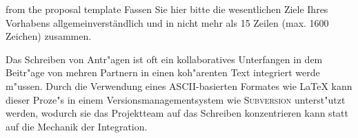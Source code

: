 \begin{Abriss}
\begin{todo}{from the proposal template}
  Fassen Sie hier bitte die wesentlichen Ziele Ihres Vorhabens allgemeinverständlich und
  in nicht mehr als 15 Zeilen (max. 1600 Zeichen) zusammen.
\end{todo}
Das Schreiben von Antr"agen ist oft ein kollaboratives Unterfangen in dem Beitr"age von
mehren Partnern in einen koh"arenten Text integriert werde m"ussen. Durch die Verwendung
eines ASCII-basierten Formates wie {\LaTeX} kann dieser Proze"s in einem
Versionsmanagementsystem wie {\textsc{Subversion}} unterst"utzt werden, wodurch sie das
Projektteam auf das Schreiben konzentrieren kann statt auf die Mechanik der Integration.
\end{Abriss}

